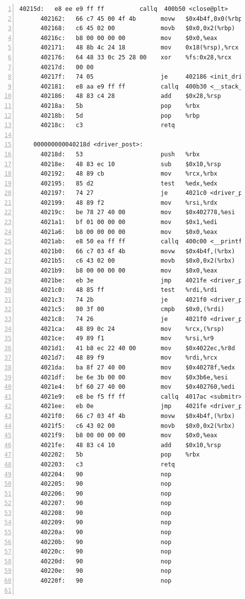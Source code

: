 \documentclass{article}
\begin{document}
\begin{lstlisting}[title = bomb的反汇编代码及部分注释, xleftmargin = 2em,xrightmargin = 2em, aboveskip = 1em, numbers = left, basicstyle=\scriptsize\ttfamily, numberstyle=\scriptsize]
      40215d:	e8 ee e9 ff ff       	callq  400b50 <close@plt>
      402162:	66 c7 45 00 4f 4b    	movw   $0x4b4f,0x0(%rbp)
      402168:	c6 45 02 00          	movb   $0x0,0x2(%rbp)
      40216c:	b8 00 00 00 00       	mov    $0x0,%eax
      402171:	48 8b 4c 24 18       	mov    0x18(%rsp),%rcx
      402176:	64 48 33 0c 25 28 00 	xor    %fs:0x28,%rcx
      40217d:	00 00 
      40217f:	74 05                	je     402186 <init_driver+0x1ce>
      402181:	e8 aa e9 ff ff       	callq  400b30 <__stack_chk_fail@plt>
      402186:	48 83 c4 28          	add    $0x28,%rsp
      40218a:	5b                   	pop    %rbx
      40218b:	5d                   	pop    %rbp
      40218c:	c3                   	retq   
    
    000000000040218d <driver_post>:
      40218d:	53                   	push   %rbx
      40218e:	48 83 ec 10          	sub    $0x10,%rsp
      402192:	48 89 cb             	mov    %rcx,%rbx
      402195:	85 d2                	test   %edx,%edx
      402197:	74 27                	je     4021c0 <driver_post+0x33>
      402199:	48 89 f2             	mov    %rsi,%rdx
      40219c:	be 78 27 40 00       	mov    $0x402778,%esi
      4021a1:	bf 01 00 00 00       	mov    $0x1,%edi
      4021a6:	b8 00 00 00 00       	mov    $0x0,%eax
      4021ab:	e8 50 ea ff ff       	callq  400c00 <__printf_chk@plt>
      4021b0:	66 c7 03 4f 4b       	movw   $0x4b4f,(%rbx)
      4021b5:	c6 43 02 00          	movb   $0x0,0x2(%rbx)
      4021b9:	b8 00 00 00 00       	mov    $0x0,%eax
      4021be:	eb 3e                	jmp    4021fe <driver_post+0x71>
      4021c0:	48 85 ff             	test   %rdi,%rdi
      4021c3:	74 2b                	je     4021f0 <driver_post+0x63>
      4021c5:	80 3f 00             	cmpb   $0x0,(%rdi)
      4021c8:	74 26                	je     4021f0 <driver_post+0x63>
      4021ca:	48 89 0c 24          	mov    %rcx,(%rsp)
      4021ce:	49 89 f1             	mov    %rsi,%r9
      4021d1:	41 b8 ec 22 40 00    	mov    $0x4022ec,%r8d
      4021d7:	48 89 f9             	mov    %rdi,%rcx
      4021da:	ba 8f 27 40 00       	mov    $0x40278f,%edx
      4021df:	be 6e 3b 00 00       	mov    $0x3b6e,%esi
      4021e4:	bf 60 27 40 00       	mov    $0x402760,%edi
      4021e9:	e8 be f5 ff ff       	callq  4017ac <submitr>
      4021ee:	eb 0e                	jmp    4021fe <driver_post+0x71>
      4021f0:	66 c7 03 4f 4b       	movw   $0x4b4f,(%rbx)
      4021f5:	c6 43 02 00          	movb   $0x0,0x2(%rbx)
      4021f9:	b8 00 00 00 00       	mov    $0x0,%eax
      4021fe:	48 83 c4 10          	add    $0x10,%rsp
      402202:	5b                   	pop    %rbx
      402203:	c3                   	retq   
      402204:	90                   	nop
      402205:	90                   	nop
      402206:	90                   	nop
      402207:	90                   	nop
      402208:	90                   	nop
      402209:	90                   	nop
      40220a:	90                   	nop
      40220b:	90                   	nop
      40220c:	90                   	nop
      40220d:	90                   	nop
      40220e:	90                   	nop
      40220f:	90                   	nop
    

\end{lstlisting}
\end{document}
